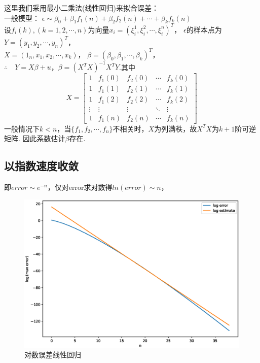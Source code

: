 \documentclass{article}
\begin{document}
    这里我们采用最小二乘法(线性回归)来拟合误差：\\
    一般模型：
    $\epsilon \sim \beta_0+\beta_1f_1(n)+\beta_2f_2(n)+\cdots+\beta_kf_k(n)$\\
    设$f_i(k),(k=1,2,\cdots,n)$为向量$x_i=(\xi_i^1,\xi_i^2,\cdots,\xi_i^n)^T$，
    $\epsilon$的样本点为$Y=(y_1,y_2,\cdots,y_n)^T$，\\
    $X=(1_n,x_1,x_2,\cdots,x_k)$，
    $\beta=(\beta_0,\beta_1,\cdots,\beta_k)^T$，\\
    $\therefore \quad Y=X\beta+u$，$\beta=(X^TX)^{-1}X^TY$.其中
    $$
    X=\begin{bmatrix}
        1 & f_1(0) & f_2(0) & \cdots & f_k(0)\\
        1 & f_1(1) & f_2(1) & \cdots & f_k(1)\\
        1 & f_1(2) & f_2(2) & \cdots & f_k(2)\\
        \vdots & \vdots & \vdots & \ddots & \vdots \\
        1 & f_1(n) & f_2(n) & \cdots & f_k(n)
    \end{bmatrix}
    $$
    一般情况下$k<n$，当$\{f_1,f_2,\cdots,f_n\}$不相关时，$X$为列满秩，故$X^TX$为$k+1$阶可逆矩阵.
    因此系数估计$\beta$存在.

    \subsection{以指数速度收敛}
    即$error\sim e^{-n}$，仅对error求对数得$ln(error)\sim n$，
    
    \begin{figure}[H]
    	\centering
    	\includegraphics[width = 16cm]{linear regression of logerror to n.eps}
    	\caption{对数误差线性回归}
    \end{figure}
	
\end{document}
